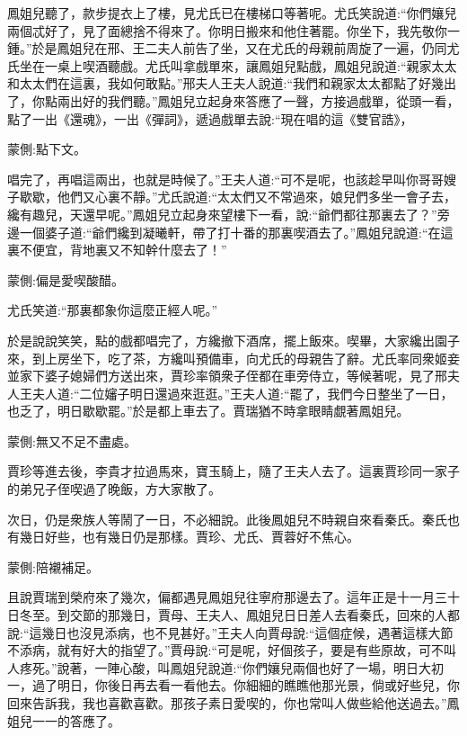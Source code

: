 \begin{parag}
    鳳姐兒聽了，款步提衣上了樓，見尤氏已在樓梯口等著呢。尤氏笑說道:“你們孃兒兩個忒好了，見了面總捨不得來了。你明日搬來和他住著罷。你坐下，我先敬你一鍾。”於是鳳姐兒在邢、王二夫人前告了坐，又在尤氏的母親前周旋了一遍，仍同尤氏坐在一桌上喫酒聽戲。尤氏叫拿戲單來，讓鳳姐兒點戲，鳳姐兒說道:“親家太太和太太們在這裏，我如何敢點。”邢夫人王夫人說道:“我們和親家太太都點了好幾出了，你點兩出好的我們聽。”鳳姐兒立起身來答應了一聲，方接過戲單，從頭一看，點了一出《還魂》，一出《彈詞》，遞過戲單去說:“現在唱的這《雙官誥》，\begin{note}蒙側:點下文。\end{note}唱完了，再唱這兩出，也就是時候了。”王夫人道:“可不是呢，也該趁早叫你哥哥嫂子歇歇，他們又心裏不靜。”尤氏說道:“太太們又不常過來，娘兒們多坐一會子去，纔有趣兒，天還早呢。”鳳姐兒立起身來望樓下一看，說:“爺們都往那裏去了？”旁邊一個婆子道:“爺們纔到凝曦軒，帶了打十番的那裏喫酒去了。”鳳姐兒說道:“在這裏不便宜，背地裏又不知幹什麼去了！”\begin{note}蒙側:偏是愛喫酸醋。\end{note}尤氏笑道:“那裏都象你這麼正經人呢。”
\end{parag}


\begin{parag}
    於是說說笑笑，點的戲都唱完了，方纔撤下酒席，擺上飯來。喫畢，大家纔出園子來，到上房坐下，吃了茶，方纔叫預備車，向尤氏的母親告了辭。尤氏率同衆姬妾並家下婆子媳婦們方送出來，賈珍率領衆子侄都在車旁侍立，等候著呢，見了邢夫人王夫人道:“二位嬸子明日還過來逛逛。”王夫人道:“罷了，我們今日整坐了一日，也乏了，明日歇歇罷。”於是都上車去了。賈瑞猶不時拿眼睛覷著鳳姐兒。\begin{note}蒙側:無又不足不盡處。\end{note}賈珍等進去後，李貴才拉過馬來，寶玉騎上，隨了王夫人去了。這裏賈珍同一家子的弟兄子侄喫過了晚飯，方大家散了。
\end{parag}


\begin{parag}
    次日，仍是衆族人等鬧了一日，不必細說。此後鳳姐兒不時親自來看秦氏。秦氏也有幾日好些，也有幾日仍是那樣。賈珍、尤氏、賈蓉好不焦心。\begin{note}蒙側:陪襯補足。\end{note}
\end{parag}


\begin{parag}
    且說賈瑞到榮府來了幾次，偏都遇見鳳姐兒往寧府那邊去了。這年正是十一月三十日冬至。到交節的那幾日，賈母、王夫人、鳳姐兒日日差人去看秦氏，回來的人都說:“這幾日也沒見添病，也不見甚好。”王夫人向賈母說:“這個症候，遇著這樣大節不添病，就有好大的指望了。”賈母說:“可是呢，好個孩子，要是有些原故，可不叫人疼死。”說著，一陣心酸，叫鳳姐兒說道:“你們孃兒兩個也好了一場，明日大初一，過了明日，你後日再去看一看他去。你細細的瞧瞧他那光景，倘或好些兒，你回來告訴我，我也喜歡喜歡。那孩子素日愛喫的，你也常叫人做些給他送過去。”鳳姐兒一一的答應了。
\end{parag}


